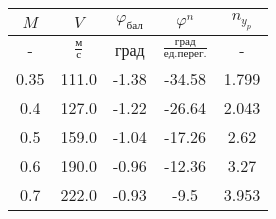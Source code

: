 \begin{tabular}{|c|c|c|c|c|}
\hline
$M$ & $V$ & $\varphi_{бал}$ & $\varphi^{n}$ & $n_{y_{p}}$ \\ 
\hline
- & $\frac{м}{с}$ & град & $\frac{град}{ед.перег.}$ & - \\ 
\hline
0.35 & 111.0 & -1.38 & -34.58 & 1.799 \\ 
\hline
0.4 & 127.0 & -1.22 & -26.64 & 2.043 \\ 
\hline
0.5 & 159.0 & -1.04 & -17.26 & 2.62 \\ 
\hline
0.6 & 190.0 & -0.96 & -12.36 & 3.27 \\ 
\hline
0.7 & 222.0 & -0.93 & -9.5 & 3.953 \\ 
\hline
\end{tabular}